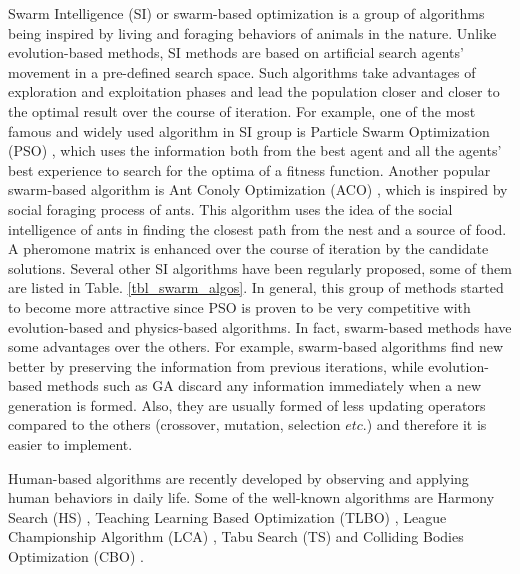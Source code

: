 \documentclass[../main.tex]{subfiles}
\begin{document}
	Swarm Intelligence (SI) or swarm-based optimization is a group of algorithms being inspired by living and foraging behaviors of animals in the nature. Unlike evolution-based methods, SI methods are based on artificial search agents' movement in a pre-defined search space. Such algorithms take advantages of exploration and exploitation phases and lead the population closer and closer to the optimal result over the course of iteration. For example, one of the most famous and widely used algorithm in SI group is Particle Swarm Optimization (PSO) \cite{eberhart1995particle}, which uses the information both from the best agent and all the agents' best experience to search for the optima of a fitness function. Another popular swarm-based algorithm is Ant Conoly Optimization (ACO) \cite{dorigo1999ant}, which is inspired by social foraging process of ants. This algorithm uses the idea of the social intelligence of ants in finding the closest path from the nest and a source of food. A pheromone matrix is
enhanced over the course of iteration by the candidate solutions.  Several other SI algorithms have been regularly proposed, some of them are listed in Table. \ref{tbl_swarm_algos}. In general, this group of methods started to become more attractive since PSO is proven to be very competitive with evolution-based and physics-based algorithms. In fact, swarm-based methods have some advantages over the others. For example, swarm-based algorithms find new better by preserving the information from previous iterations, while evolution-based methods such as GA discard any information immediately when a new generation is formed. Also, they are usually formed of less updating operators compared to the others (crossover, mutation, selection $etc.$) and therefore it is easier to implement.


	Human-based algorithms are recently developed by observing and applying human behaviors in daily life. Some of the well-known algorithms are Harmony Search (HS) \cite{geem2001new}, Teaching Learning Based Optimization (TLBO) \cite{rao2011teaching}, League Championship Algorithm (LCA) \cite{kashan2014league}, Tabu Search (TS) \cite{de1989tabu} and Colliding Bodies Optimization (CBO) \cite{kaveh2014colliding}. 
\end{document}
